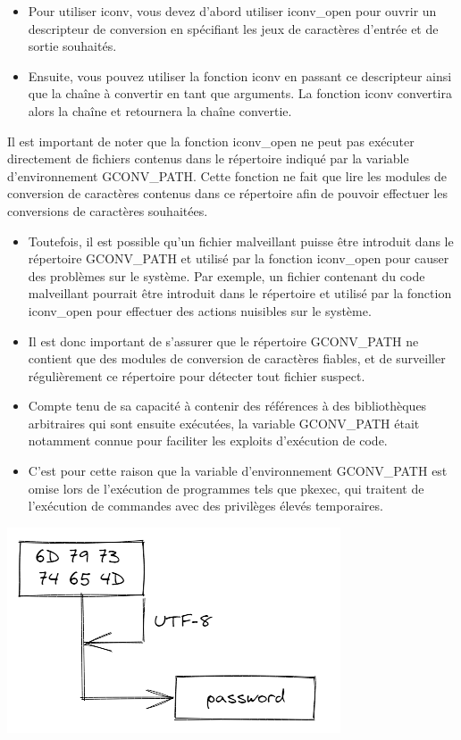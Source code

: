 \documentclass[12pt,a4paper]{article}
\begin{document}
\begin{flushleft}
                \begin{itemize}
                    \item Pour utiliser iconv, vous devez d'abord utiliser iconv\_open pour ouvrir un descripteur de conversion en spécifiant les jeux de caractères d'entrée et de sortie souhaités. 
                    \item Ensuite, vous pouvez utiliser la fonction iconv en passant ce descripteur ainsi que la chaîne à convertir en tant que arguments. La fonction iconv convertira alors la chaîne et retournera la chaîne convertie.
                \end{itemize}
                \item Il est important de noter que la fonction iconv\_open ne peut pas exécuter directement de fichiers contenus dans le répertoire indiqué par la variable d'environnement GCONV\_PATH. Cette fonction ne fait que lire les modules de conversion de caractères contenus dans ce répertoire afin de pouvoir effectuer les conversions de caractères souhaitées.
                \begin{itemize}
                    \item Toutefois, il est possible qu'un fichier malveillant puisse être introduit dans le répertoire GCONV\_PATH et utilisé par la fonction iconv\_open pour causer des problèmes sur le système. Par exemple, un fichier contenant du code malveillant pourrait être introduit dans le répertoire et utilisé par la fonction iconv\_open pour effectuer des actions nuisibles sur le système.
                    \item Il est donc important de s'assurer que le répertoire GCONV\_PATH ne contient que des modules de conversion de caractères fiables, et de surveiller régulièrement ce répertoire pour détecter tout fichier suspect.
                    \item Compte tenu de sa capacité à contenir des références à des bibliothèques arbitraires qui sont ensuite exécutées, la variable GCONV\_PATH était notamment connue pour faciliter les exploits d’exécution de code. 
                    \item C’est pour cette raison que la variable d’environnement GCONV\_PATH est omise lors de l’exécution de programmes tels que pkexec, qui traitent de l’exécution de commandes avec des privilèges élevés temporaires.
                \end{itemize}

                \begin{center}
                    \includegraphics[scale=0.5]{iconv_open}
                \end{center}


\end{flushleft}
\end{document}
